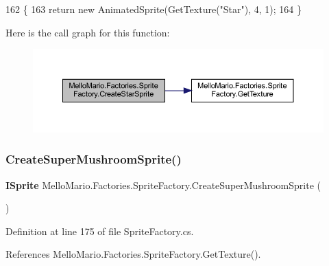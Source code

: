 \begin{DoxyCode}
162         \{
163             \textcolor{keywordflow}{return} \textcolor{keyword}{new} AnimatedSprite(GetTexture(\textcolor{stringliteral}{"Star"}), 4, 1);
164         \}
\end{DoxyCode}
Here is the call graph for this function\+:
\nopagebreak
\begin{figure}[H]
\begin{center}
\leavevmode
\includegraphics[width=350pt]{classMelloMario_1_1Factories_1_1SpriteFactory_a697dac7e84cbd36a29ab5f10a935deef_cgraph}
\end{center}
\end{figure}
\mbox{\label{classMelloMario_1_1Factories_1_1SpriteFactory_a99d20b598b1ddf39d02a7354721a4bcf}} 
\subsubsection{Create\+Super\+Mushroom\+Sprite()}
{\footnotesize\ttfamily \textbf{ I\+Sprite} Mello\+Mario.\+Factories.\+Sprite\+Factory.\+Create\+Super\+Mushroom\+Sprite (\begin{DoxyParamCaption}{ }\end{DoxyParamCaption})}



Definition at line 175 of file Sprite\+Factory.\+cs.



References Mello\+Mario.\+Factories.\+Sprite\+Factory.\+Get\+Texture().


